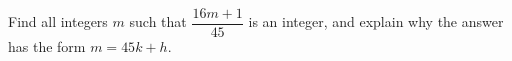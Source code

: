 Find all integers $m$ such that $\dfrac{16m+1}{45}$ is an integer, and explain why the answer has the form $m=45k+h$.
